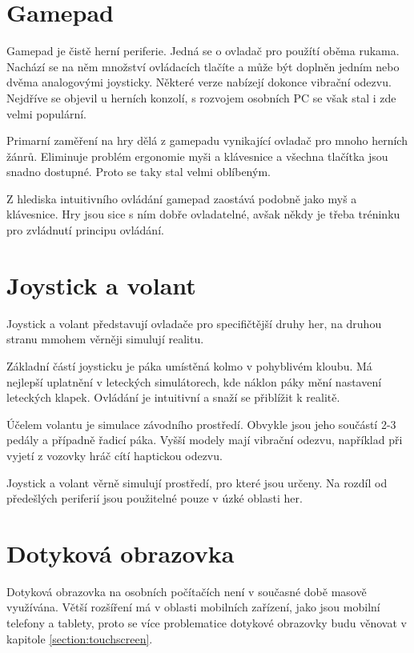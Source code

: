 \documentclass[thesis=B,czech,hidelinks]{FITthesis}[2012/06/26] %
\begin{document}
\section{Gamepad}

Gamepad je čistě herní periferie. Jedná se o ovladač pro použítí oběma rukama. Nachází se na něm množství ovládacích tlačíte a může být doplněn jedním nebo dvěma analogovými joysticky. Některé verze nabízejí dokonce vibrační odezvu. Nejdříve se objevil u herních konzolí, s rozvojem osobních PC se však stal i zde velmi populární.

Primarní zaměření na hry dělá z gamepadu vynikající ovladač pro mnoho herních žánrů. Eliminuje problém ergonomie myši a klávesnice a všechna tlačítka jsou snadno dostupné. Proto se taky stal velmi oblíbeným.

Z hlediska intuitivního ovládání gamepad zaostává podobně jako myš a klávesnice. Hry jsou sice s ním dobře ovladatelné, avšak někdy je třeba tréninku pro zvládnutí principu ovládání.

\section{Joystick a volant}

Joystick a volant představují ovladače pro specifičtější druhy her, na druhou stranu mmohem věrněji simulují realitu.

Základní částí joysticku je páka umístěná kolmo v pohyblivém kloubu. Má nejlepší uplatnění v leteckých simulátorech, kde náklon páky mění nastavení leteckých klapek. Ovládání je intuitivní a snaží se přiblížit k realitě.

Účelem volantu je simulace závodního prostředí. Obvykle jsou jeho součástí 2-3 pedály a případně řadicí páka. Vyšší modely mají vibrační odezvu, například při vyjetí z vozovky hráč cítí haptickou odezvu.

Joystick a volant věrně simulují prostředí, pro které jsou určeny. Na rozdíl od předešlých periferií jsou použitelné pouze v úzké oblasti her.

\section{Dotyková obrazovka}

Dotyková obrazovka na osobních počítačích není v současné době masově využívána. Větší rozšíření má v oblasti mobilních zařízení, jako jsou mobilní telefony a tablety, proto se více problematice dotykové obrazovky budu věnovat v kapitole \ref{section:touchscreen}.
\end{document}
